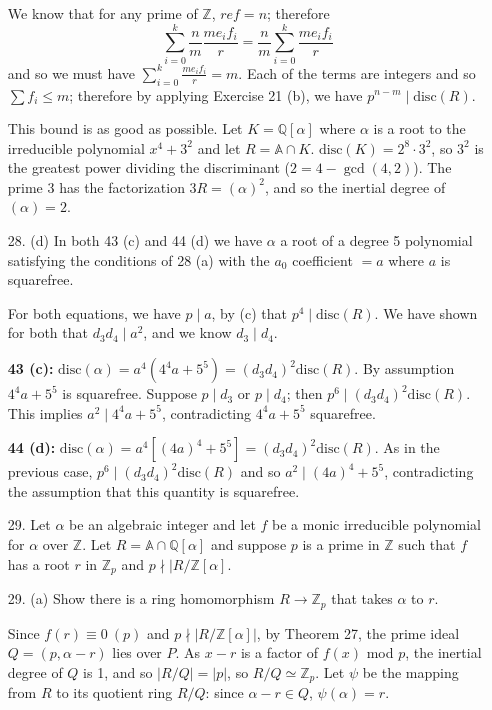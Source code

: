 \documentclass{article}
\newcommand{\Q}[0]{\mathbb{Q}}
\newcommand{\Z}[0]{\mathbb{Z}}
\newcommand{\disc}[1]{\text{disc}(#1)}
\newcommand{\ringofintegers}[1]{\mathbb{A} \cap #1}
\begin{document}
\begin{enumerate}
We know that for any prime of $\Z$, $ref = n$; therefore \[\sum_{i = 0}^{k} \frac{n}{m}\frac{m e_i f_i}{r} = \frac{n}{m} \sum_{i = 0}^{k} \frac{m e_i f_i}{r}\] and so we must have $\sum_{i = 0}^{k} \frac{m e_i f_i}{r} = m$.  Each of the terms are integers and so $\sum f_i \leq m$; therefore by applying Exercise 21 (b), we have $p^{n - m} \mid \disc{R}$.

This bound is as good as possible.  Let $K = \Q[\alpha]$ where $\alpha$ is a root to the irreducible polynomial $x^4 + 3^2$ and let $R = \ringofintegers{K}$.  $\disc{K} = 2^8 \cdot 3^2$, so $3^2$ is the greatest power dividing the discriminant ($2 = 4 - \gcd(4, 2)$).  The prime $3$ has the factorization $3R = (\alpha)^2$, and so the inertial degree of $(\alpha) = 2$.

\item[28. (d)]
    In both 43 (c) and 44 (d) we have $\alpha$ a root of a degree 5 polynomial satisfying the conditions of 28 (a) with the $a_0$ coefficient $ = a$ where $a$ is squarefree.

    For both equations, we have $p \mid a$, by (c) that $p^4 \mid \disc{R}$.  We have shown for both that $d_3 d_4 \mid a^2$, and we know $d_3 \mid d_4$.

    {\bf 43 (c):} $\disc{\alpha} = a^4(4^4 a + 5^5) = (d_3 d_4)^2 \disc{R}$.
    By assumption $4^4a + 5^5$ is squarefree.  Suppose $p \mid d_3$ or $p \mid d_4$; then $p^6 \mid (d_3 d_4)^2\disc{R}$.  This implies $a^2 \mid 4^4a + 5^5$, contradicting $4^4a + 5^5$ squarefree.

    {\bf 44 (d):} $\disc{\alpha} = a^4[(4a)^4 + 5^5] = (d_3 d_4)^2 \disc{R}$.  As in the previous case, $p^6 \mid (d_3 d_4)^2 \disc{R}$ and so $a^2 \mid (4a)^4 + 5^5$, contradicting the assumption that this quantity is squarefree.

\item[29.]
    Let $\alpha$ be an algebraic integer and let $f$ be a monic irreducible polynomial for $\alpha$ over $\Z$.  Let $R = \ringofintegers{\Q[\alpha]$ and suppose $p$ is a prime in $\Z$ such that $f$ has a root $r$ in $\Z_p$ and $p \nmid |R/\Z[\alpha]}$.

\item[29. (a)] Show there is a ring homomorphism $R \to \Z_p$ that takes $\alpha$ to $r$.

    Since $f(r) \equiv 0\ (p)$ and $p \nmid |R/\Z[\alpha]|$, by Theorem 27, the prime ideal $Q = (p, \alpha - r)$ lies over $P$.  As $x - r$ is a factor of $f(x)$ mod $p$, the inertial degree of $Q$ is 1, and so $|R / Q| = |p|$, so $R / Q \simeq \Z_{p}$.  Let $\psi$ be the mapping from $R$ to its quotient ring $R / Q$: since $\alpha - r \in Q$, $\psi(\alpha) = r$.


\end{enumerate}
\end{document}
